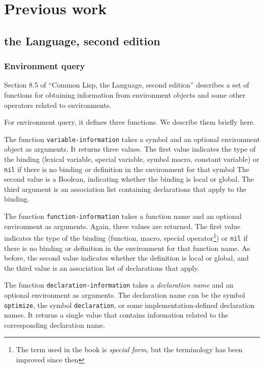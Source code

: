 \section{Previous work}

\subsection{\commonlisp{} the Language, second edition}

\subsubsection{Environment query}

Section 8.5 of ``Common Lisp, the Language, second edition'' describes
a set of functions for obtaining information from environment
objects and some other operators related to environments.

For environment query, it defines three functions.  We describe them
briefly here.

The function \texttt{variable-information} takes a symbol and an
optional environment object as arguments.  It returns three values.
The first value indicates the type of the binding (lexical variable,
special variable, symbol macro, constant variable) or \texttt{nil} if
there is no binding or definition in the environment for that symbol
The second value is a Boolean, indicating whether the binding is local
or global.  The third argument is an association list containing
declarations that apply to the binding.

The function \texttt{function-information} takes a function name and
an optional environment as arguments.  Again, three values are
returned.  The first value indicates the type of the binding
(function, macro, special operator\footnote{The term used in the book
  is \emph{special form}, but the terminology has been improved since
  then}) or \texttt{nil} if there is no binding or definition in the
environment for that function name.  As before, the second value
indicates whether the definition is local or global, and the third
value is an association list of declarations that apply.

The function \texttt{declaration-information} takes a
\emph{declaration name} and an optional environment as arguments.  The
declaration name can be the symbol \texttt{optimize}, the symbol
\texttt{declaration}, or some implementation-defined declaration
names.  It returns a single value that contains information related to
the corresponding declaration name.


